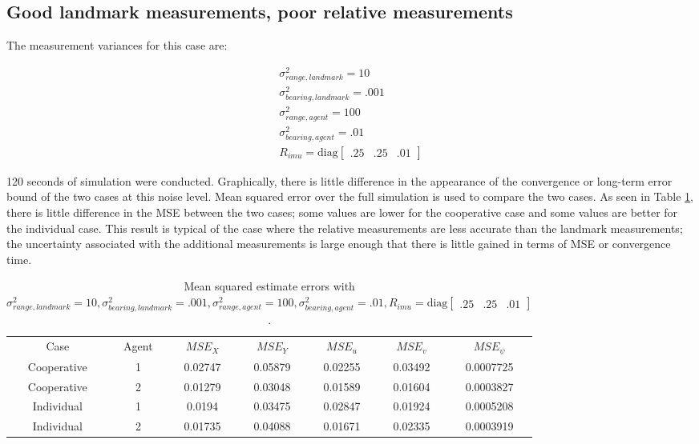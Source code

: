 \documentclass{aiaa-tc}
\newcommand{\tvecth}[3]{\begin{bmatrix}#1&#2&#3\end{bmatrix}}%
\begin{document}
\subsection{Good landmark measurements, poor relative measurements}

The measurement variances for this case are:

\begin{eqnarray}
\sigma^2_{range,landmark} = 10 \\
\sigma^2_{bearing,landmark} = .001\\
\sigma^2_{range,agent} = 100 \\
\sigma^2_{bearing,agent} = .01\\
R_{imu} = \mathrm{diag}\tvecth{.25}{.25}{.01}
\end{eqnarray}

120 seconds of simulation were conducted. Graphically, there is little difference in the appearance of the convergence or long-term error bound of the two cases at this noise level. Mean squared error over the full simulation is used to compare the two cases. As seen in Table \ref{tab:good_landmark}, there is little difference in the MSE between the two cases; some values are lower for the cooperative case and some values are better for the individual case. This result is typical of the case where the relative measurements are less accurate than the landmark measurements; the uncertainty associated with the additional measurements is large enough that there is little gained in terms of MSE or convergence time.

\begin{table}
\centering
\begin{tabular}{ccccccc}
Case & Agent & $MSE_X$ & $MSE_Y$ & $MSE_u$ & $MSE_v$ & $MSE_\psi$\\ 
Cooperative & 1 &0.02747 &0.05879 &0.02255 &0.03492 &0.0007725\\ 
Cooperative & 2 &0.01279 &0.03048 &0.01589 &0.01604 &0.0003827\\ 
Individual & 1 &0.0194 &0.03475 &0.02847 &0.01924 &0.0005208\\ 
Individual & 2 &0.01735 &0.04088 &0.01671 &0.02335 &0.0003919\\
\end{tabular}
\caption{Mean squared estimate errors with $\sigma^2_{range,landmark} = 10, \sigma^2_{bearing,landmark} = .001,\sigma^2_{range,agent} = 100, \sigma^2_{bearing,agent} = .01,R_{imu} = \mathrm{diag}\tvecth{.25}{.25}{.01}$.}
\label{tab:good_landmark}
\end{table}
\end{document}
